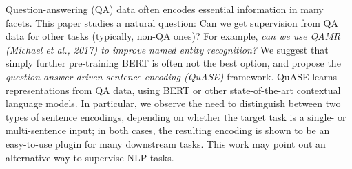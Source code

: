 Question-answering (QA) data often encodes essential information in many facets. This paper studies a natural question: Can we get supervision from QA data for other tasks (typically, non-QA ones)? For example, {\em can we use QAMR (Michael et al., 2017) to improve named entity recognition?} We suggest that simply further pre-training BERT is often not the best option, and propose the {\em question-answer driven sentence encoding (QuASE)} framework. QuASE learns representations from QA data, using BERT or other state-of-the-art contextual language models. In particular, we observe the need to distinguish between two types of sentence encodings, depending on whether the target task is a single- or multi-sentence input; in both cases, the resulting encoding is shown to be an easy-to-use plugin for many downstream tasks. This work may point out an alternative way to supervise NLP tasks.
